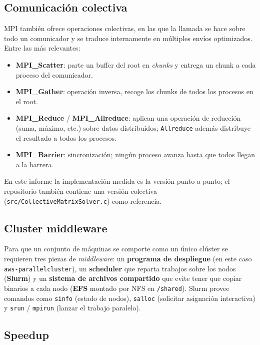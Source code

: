 \documentclass{article}
\begin{document}
\subsection{Comunicación colectiva}

MPI también ofrece operaciones colectivas, en las que la llamada se hace sobre todo un comunicador y se traduce internamente en múltiples envíos optimizados. Entre las más relevantes:

\begin{itemize}
    \item \textbf{MPI\_Scatter}: parte un buffer del root en \emph{chunks} y entrega un chunk a cada proceso del comunicador.
    \item \textbf{MPI\_Gather}: operación inversa, recoge los chunks de todos los procesos en el root.
    \item \textbf{MPI\_Reduce} / \textbf{MPI\_Allreduce}: aplican una operación de reducción (suma, máximo, etc.) sobre datos distribuidos; \texttt{Allreduce} además distribuye el resultado a todos los procesos.
    \item \textbf{MPI\_Barrier}: sincronización; ningún proceso avanza hasta que todos llegan a la barrera.
\end{itemize}

En este informe la implementación medida es la versión punto a punto; el repositorio también contiene una versión colectiva (\texttt{src/CollectiveMatrixSolver.c}) como referencia.

\subsection{Cluster middleware}

Para que un conjunto de máquinas se comporte como un único clúster se requieren tres piezas de \emph{middleware}: un \textbf{programa de despliegue} (en este caso \texttt{aws-parallelcluster}), un \textbf{scheduler} que reparta trabajos sobre los nodos (\textbf{Slurm}) y un \textbf{sistema de archivos compartido} que evite tener que copiar binarios a cada nodo (\textbf{EFS} montado por NFS en \texttt{/shared}). Slurm provee comandos como \texttt{sinfo} (estado de nodos), \texttt{salloc} (solicitar asignación interactiva) y \texttt{srun} / \texttt{mpirun} (lanzar el trabajo paralelo).

\subsection{Speedup}
\end{document}

